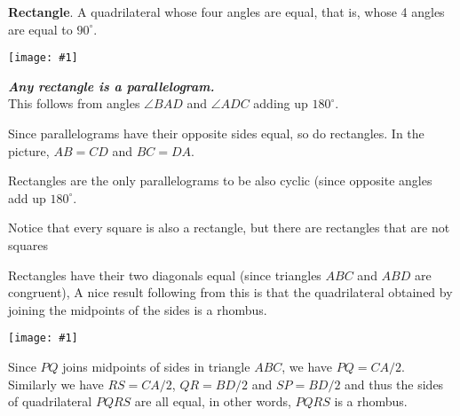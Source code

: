 \documentclass[12pt]{article}
\newcommand{\figura}[1]{\begin{center}\texttt{[image: \#1]}\end{center}}
\begin{document}
\textbf{Rectangle}.
A quadrilateral whose four angles are equal, that is, whose 4 angles are equal to $90^\circ$.

\figura{rectangulo}


\emph{\bf Any rectangle is a parallelogram.}\\
This follows from angles $\angle BAD $ and $\angle ADC$ adding up $180^\circ$.

Since parallelograms have their opposite sides equal, so do rectangles. In the picture, $AB=CD$ and $BC=DA$.

Rectangles are the only parallelograms to be also cyclic (since opposite angles add up $180^\circ$.

Notice that every square is also a rectangle, but there are rectangles that are not squares

Rectangles have their two diagonals equal (since triangles $ABC$ and $ABD$ are congruent), A nice result following from this is that the quadrilateral obtained by joining the midpoints of the sides is a rhombus.

\figura{rectangulo2}

Since $PQ$ joins midpoints of sides in triangle $ABC$, we have $PQ=CA/2$. Similarly we have $RS=CA/2$, $QR=BD/2$ and $SP=BD/2$ and thus the sides of quadrilateral $PQRS$ are all equal, in other words, $PQRS$ is a rhombus.
\end{document}
